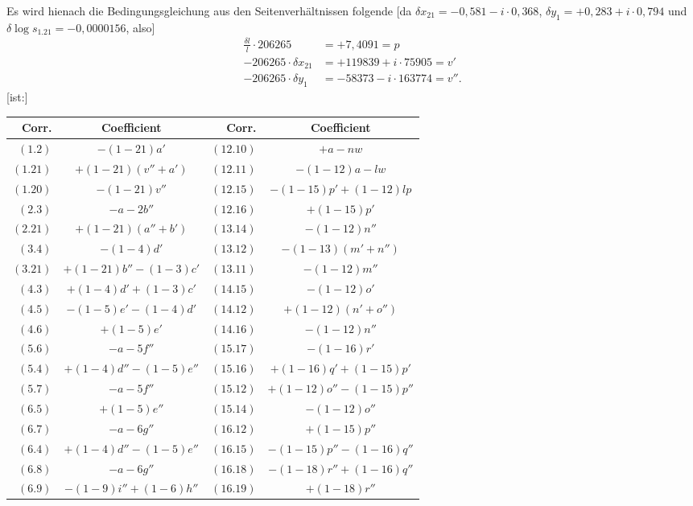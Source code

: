 \documentclass[12pt,a4paper]{article}
\theoremstyle{plain}
\theoremstyle{definition}
\theoremstyle{remark}
\begin{document}
Es wird hienach die Bedingungsgleichung aus den Seitenverh\"altnissen folgende [da $\delta x_{21} = -0{,}581 - i \cdot 0{,}368$, $\delta y_1 = +0{,}283 + i \cdot 0{,}794$ und $\delta\log s_{1.21} = -0{,}0000156$, also]
\begin{align*}
\frac{\delta l}{l} \cdot 206265 &= +7{,}4091 = p\\
-206265 \cdot \delta x_{21} &= +119839 + i \cdot 75905 = v'\\
-206265 \cdot \delta y_1 &= -58373 - i \cdot 163774 = v''.
\end{align*}
[ist:]

\newpage
\begin{center}
\begin{tabular}{r|c||r|c}
Corr. & Coefficient & Corr. & Coefficient\\
\hline
$(1.2)$ & $-(1-21)a'$ & $(12.10)$ & $+a - nw$\\
$(1.21)$ & $+(1-21)(v'' + a')$ & $(12.11)$ & $-(1-12)a - lw$\\
$(1.20)$ & $-(1-21)v''$ & $(12.15)$ & $-(1-15)p' + (1-12)lp$\\
$(2.3)$ & $-a - 2b''$ & $(12.16)$ & $+(1-15)p'$\\
$(2.21)$ & $+(1-21)(a'' + b')$ & $(13.14)$ & $-(1-12)n''$\\
$(3.4)$ & $-(1-4)d'$ & $(13.12)$ & $-(1-13)(m' + n'')$\\
$(3.21)$ & $+(1-21)b'' - (1-3)c'$ & $(13.11)$ & $-(1-12)m''$\\
$(4.3)$ & $+(1-4)d' + (1-3)c'$ & $(14.15)$ & $-(1-12)o'$\\
$(4.5)$ & $-(1-5)e' - (1-4)d'$ & $(14.12)$ & $+(1-12)(n' + o'')$\\
$(4.6)$ & $+(1-5)e'$ & $(14.16)$ & $-(1-12)n''$\\
$(5.6)$ & $-a - 5f''$ & $(15.17)$ & $-(1-16)r'$\\
$(5.4)$ & $+(1-4)d'' - (1-5)e''$ & $(15.16)$ & $+(1-16)q' + (1-15)p'$\\
$(5.7)$ & $-a - 5f''$ & $(15.12)$ & $+(1-12)o'' - (1-15)p''$\\
$(6.5)$ & $+(1-5)e''$ & $(15.14)$ & $-(1-12)o''$\\
$(6.7)$ & $-a - 6g''$ & $(16.12)$ & $+(1-15)p''$\\
$(6.4)$ & $+(1-4)d'' - (1-5)e''$ & $(16.15)$ & $-(1-15)p'' - (1-16)q''$\\
$(6.8)$ & $-a - 6g''$ & $(16.18)$ & $-(1-18)r'' + (1-16)q''$\\
$(6.9)$ & $-(1-9)i'' + (1-6)h''$ & $(16.19)$ & $+(1-18)r''$\\

\end{tabular}
\end{center}
\end{document}
